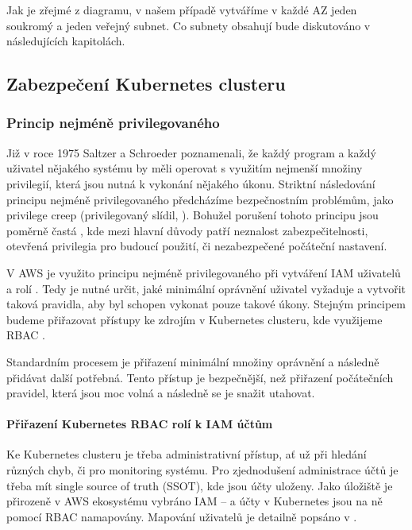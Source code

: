 \documentclass[thesis=M,czech]{FITthesis}[2019/12/23]
\theoremstyle{plain}
\theoremstyle{definition}
\begin{document}
Jak je zřejmé z diagramu, v našem případě vytváříme v každé AZ jeden soukromý a jeden veřejný subnet. Co subnety obsahují bude diskutováno v následujících kapitolách.

\subsection{Zabezpečení Kubernetes clusteru}


\subsubsection{Princip nejméně privilegovaného}

Již v roce 1975 Saltzer a Schroeder poznamenali, že každý program a každý uživatel nějakého systému by měli operovat s využitím nejmenší množiny privilegií, která jsou nutná k vykonání nějakého úkonu. \cite{least-priv1} Striktní následování principu nejméně privilegovaného předcházíme bezpečnostním problémům, jako privilege creep (privilegovaný slídil, \cite{least-priv3}). Bohužel porušení tohoto principu jsou poměrně častá \cite{least-priv2}, kde mezi hlavní důvody patří neznalost zabezpečitelnosti, otevřená privilegia pro budoucí použití, či nezabezpečené počáteční nastavení.

V AWS je využito principu nejméně privilegovaného při vytváření IAM uživatelů a rolí \cite{aws-iam}. Tedy je nutné určit, jaké minimální oprávnění uživatel vyžaduje a vytvořit taková pravidla, aby byl schopen vykonat pouze takové úkony. Stejným principem budeme přiřazovat přístupy ke zdrojím v Kubernetes clusteru, kde využijeme RBAC \cite{k8s-rbac}.

Standardním procesem je přiřazení minimální množiny oprávnění a následně přidávat další potřebná. Tento přístup je bezpečnější, než přiřazení počátečních pravidel, která jsou moc volná a následně  se je snažit utahovat. 


\paragraph{Přiřazení Kubernetes RBAC rolí k IAM účtům}

Ke Kubernetes clusteru je třeba administrativní přístup, ať už při hledání různých chyb, či pro monitoring systému. Pro zjednodušení administrace účtů je třeba  mít single source of truth (SSOT), kde jsou účty uloženy. Jako úložiště je přirozeně v AWS ekosystému vybráno IAM -- a účty v Kubernetes jsou na ně pomocí RBAC namapovány. Mapování uživatelů je detailně popsáno v \cite{iam-rbac-mapping}.
\end{document}
